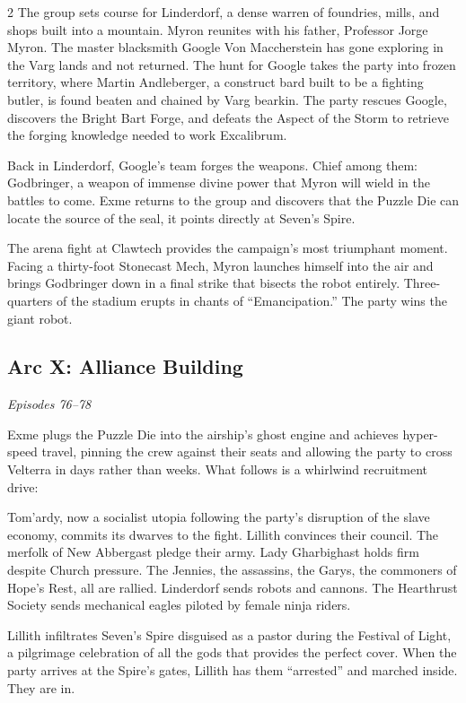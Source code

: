\begin{multicols}{2}
The group sets course for Linderdorf, a dense warren of foundries, mills, and shops built into a mountain.  Myron reunites with his father, Professor Jorge Myron.  The master blacksmith Google Von Maccherstein has gone exploring in the Varg lands and not returned.  The hunt for Google takes the party into frozen territory, where Martin Andleberger, a construct bard built to be a fighting butler, is found beaten and chained by Varg bearkin.  The party rescues Google, discovers the Bright Bart Forge, and defeats the Aspect of the Storm to retrieve the forging knowledge needed to work Excalibrum.

Back in Linderdorf, Google's team forges the weapons.  Chief among them: Godbringer, a weapon of immense divine power that Myron will wield in the battles to come.  Exme returns to the group and discovers that the Puzzle Die can locate the source of the seal, it points directly at Seven's Spire.

The arena fight at Clawtech provides the campaign's most triumphant moment.  Facing a thirty-foot Stonecast Mech, Myron launches himself into the air and brings Godbringer down in a final strike that bisects the robot entirely.  Three-quarters of the stadium erupts in chants of ``Emancipation.''  The party wins the giant robot.

\subsection*{Arc X: Alliance Building}
\textit{Episodes 76--78}

\medskip

\noindent
Exme plugs the Puzzle Die into the airship's ghost engine and achieves hyper-speed travel, pinning the crew against their seats and allowing the party to cross Velterra in days rather than weeks.  What follows is a whirlwind recruitment drive:

Tom'ardy, now a socialist utopia following the party's disruption of the slave economy, commits its dwarves to the fight.  Lillith convinces their council.  The merfolk of New Abbergast pledge their army.  Lady Gharbighast holds firm despite Church pressure.  The Jennies, the assassins, the Garys, the commoners of Hope's Rest, all are rallied.  Linderdorf sends robots and cannons.  The Hearthrust Society sends mechanical eagles piloted by female ninja riders.

Lillith infiltrates Seven's Spire disguised as a pastor during the Festival of Light, a pilgrimage celebration of all the gods that provides the perfect cover.  When the party arrives at the Spire's gates, Lillith has them ``arrested'' and marched inside.  They are in.


\end{multicols}
